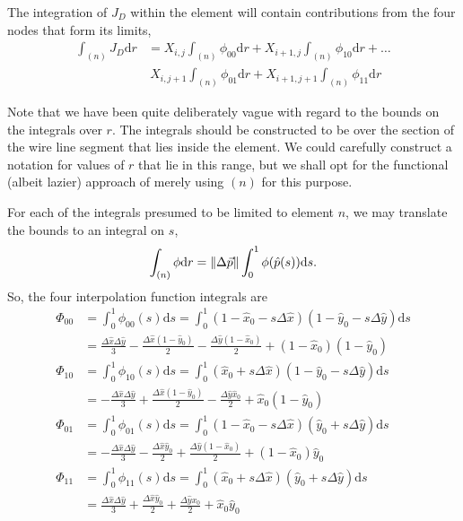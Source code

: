 The integration of $J_D$ within the element will contain contributions from the four nodes that form its limits,
\begin{align}
\int_{(n)} J_D \mathrm{d} r &= X_{i,j} \int_{(n)} \phi_{00} \mathrm{d} r + X_{i+1,j} \int_{(n)} \phi_{10} \mathrm{d} r + \ldots \\
&\ X_{i,j+1} \int_{(n)} \phi_{01} \mathrm{d} r + X_{i+1,j+1} \int_{(n)} \phi_{11} \mathrm{d} r \label{eqn:intJD:element}
\end{align}

Note that we have been quite deliberately vague with regard to the bounds on the integrals over $r$.  The integrals should be constructed to be over the section of the wire line segment that lies inside the element.  We could carefully construct a notation for values of $r$ that lie in this range, but we shall opt for the functional (albeit lazier) approach of merely using $(n)$ for this purpose.  

For each of the integrals presumed to be limited to element $n$, we may translate the bounds to an integral on $s$,
\begin{align}
\int_{(n)} \phi \mathrm{d}r = \|\Delta\vec{p}\| \int_0^1 \phi(\hat{p}(s)) \mathrm{d} s.
\end{align}
So, the four interpolation function integrals are
\begin{subequations}
\begin{align}
\Phi_{00} &= \int_0^1 \phi_{00}(s) \mathrm{d}s = \int_0^1 (1-\hat{x}_0 - s\Delta\hat{x})(1-\hat{y}_0-s\Delta\hat{y})\mathrm{d}s\nonumber\\
 &= \frac{\Delta \hat{x} \Delta \hat{y}}{3} - \frac{\Delta \hat{x} (1-\hat{y}_0)}{2} - \frac{\Delta \hat{y} (1-\hat{x}_0)}{2} + (1-\hat{x}_0)(1-\hat{y}_0)\\
\Phi_{10} &= \int_0^1 \phi_{10}(s) \mathrm{d}s = \int_0^1 (\hat{x}_0 + s\Delta\hat{x})(1-\hat{y}_0-s\Delta\hat{y})\mathrm{d}s\nonumber\\
 &= -\frac{\Delta \hat{x} \Delta \hat{y}}{3} + \frac{\Delta \hat{x} (1-\hat{y}_0)}{2} - \frac{\Delta \hat{y} \hat{x}_0}{2} + \hat{x}_0(1-\hat{y}_0)\\
\Phi_{01} &= \int_0^1 \phi_{01}(s) \mathrm{d}s = \int_0^1 (1 - \hat{x}_0 - s\Delta\hat{x})(\hat{y}_0+s\Delta\hat{y})\mathrm{d}s\nonumber\\
 &= -\frac{\Delta \hat{x} \Delta \hat{y}}{3} - \frac{\Delta \hat{x} \hat{y}_0}{2} + \frac{\Delta \hat{y} (1-\hat{x}_0)}{2} + (1-\hat{x}_0)\hat{y}_0\\
\Phi_{11} &= \int_0^1 \phi_{11}(s) \mathrm{d}s = \int_0^1 (\hat{x}_0 + s\Delta\hat{x})(\hat{y}_0+s\Delta\hat{y})\mathrm{d}s\nonumber\\
 &= \frac{\Delta \hat{x} \Delta \hat{y}}{3} + \frac{\Delta \hat{x} \hat{y}_0}{2} + \frac{\Delta \hat{y} x_0}{2} + \hat{x}_0 \hat{y}_0
\end{align}
\end{subequations}

